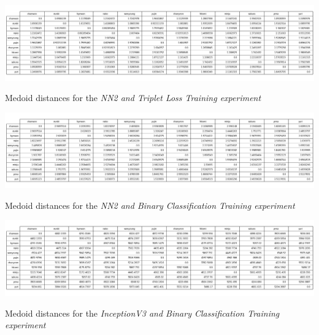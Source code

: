 \begin{landscape}
\begin{table}[h]
    \centering
    \includegraphics[width=\linewidth]{images/faceReco/nn2-and-triplet/medoid.png}
    \caption{Medoid distances for the \it{NN2 and Triplet Loss Training} experiment}
    \label{Table:Face-Recognition:Results:nn2-and-triplet-medoid}
\end{table}

\begin{table}[h]
    \centering
    \includegraphics[width=\linewidth]{images/faceReco/nn2-and-binary/medoid.png}
    \caption{Medoid distances for the \it{NN2 and Binary Classification Training} experiment}
    \label{Table:Face-Recognition:Results:nn2-and-binary-medoid}
\end{table}


\begin{table}[h]
    \centering
    \includegraphics[width=\linewidth]{images/faceReco/inceptionv3-and-binary/medoid.png}
    \caption{Medoid distances for the \it{InceptionV3 and Binary Classification Training} experiment}
    \label{Table:Face-Recognition:Results:inceptionv3-and-binary-medoid}
\end{table}

\end{landscape}